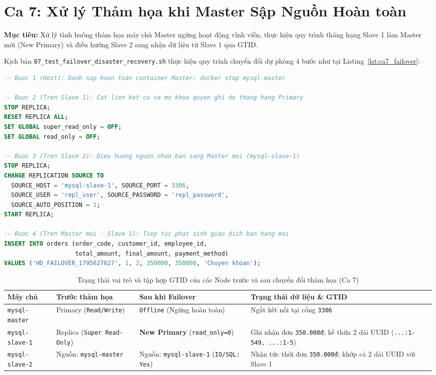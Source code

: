 \documentclass[12pt,a4paper]{report}
\begin{document}
\section{Ca 7: Xử lý Thảm họa khi Master Sập Nguồn Hoàn toàn}
\textbf{Mục tiêu:} Xử lý tình huống thảm họa máy chủ Master ngừng hoạt động vĩnh viễn, thực hiện quy trình thăng hạng Slave 1 làm Master mới (New Primary) và điều hướng Slave 2 sang nhận dữ liệu từ Slave 1 qua GTID.

Kịch bản \texttt{07\_test\_failover\_disaster\_recovery.sh} thực hiện quy trình chuyển đổi dự phòng 4 bước như tại Listing~\ref{lst:ca7_failover}:

\begin{lstlisting}[language=SQL, label={lst:ca7_failover}, caption={Quy trình thăng hạng Slave 1 làm Primary mới và điều hướng lại Slave 2 (Ca 7)}]
-- Buoc 1 (Host): Danh sap hoan toan container Master: docker stop mysql-master

-- Buoc 2 (Tren Slave 1): Cat lien ket cu va mo khoa quyen ghi de thang hang Primary
STOP REPLICA;
RESET REPLICA ALL;
SET GLOBAL super_read_only = OFF;
SET GLOBAL read_only = OFF;

-- Buoc 3 (Tren Slave 2): Dieu huong nguon nhan ban sang Master moi (mysql-slave-1)
STOP REPLICA;
CHANGE REPLICATION SOURCE TO
  SOURCE_HOST = 'mysql-slave-1', SOURCE_PORT = 3306,
  SOURCE_USER = 'repl_user', SOURCE_PASSWORD = 'repl_password',
  SOURCE_AUTO_POSITION = 1;
START REPLICA;

-- Buoc 4 (Tren Master moi - Slave 1): Tiep tuc phat sinh giao dich ban hang moi
INSERT INTO orders (order_code, customer_id, employee_id,
                    total_amount, final_amount, payment_method)
VALUES ('HD_FAILOVER_1795627627', 1, 2, 350000, 350000, 'Chuyen khoan');
\end{lstlisting}

\begin{table}[H]
\centering
\footnotesize
\caption{Trạng thái vai trò và tập hợp GTID của các Node trước và sau chuyển đổi thảm họa (Ca 7)}
\label{tab:ca7_results}
\vspace{0.15cm}
\begin{tabularx}{\textwidth}{L{2.8cm} L{3.6cm} L{3.8cm} Y}
\toprule
\textbf{Máy chủ} & \textbf{Trước thảm họa} & \textbf{Sau khi Failover} & \textbf{Trạng thái dữ liệu \& GTID} \\
\midrule
\texttt{mysql-master} & Primary (\texttt{Read/Write}) & \texttt{Offline} (Ngừng hoàn toàn) & Ngắt kết nối tại cổng \texttt{3306} \\
\texttt{mysql-slave-1} & Replica (\texttt{Super Read-Only}) & \textbf{New Primary} (\texttt{read\_only=0}) & Ghi nhận đơn \texttt{350.000đ}; kế thừa 2 dải UUID (\texttt{...:1-549, ...:1-5}) \\
\texttt{mysql-slave-2} & Nguồn: \texttt{mysql-master} & Nguồn: \texttt{mysql-slave-1} (\texttt{IO/SQL: Yes}) & Nhận tức thời đơn \texttt{350.000đ}; khớp cả 2 dải UUID với Slave 1 \\
\bottomrule
\end{tabularx}
\end{table}
\end{document}
